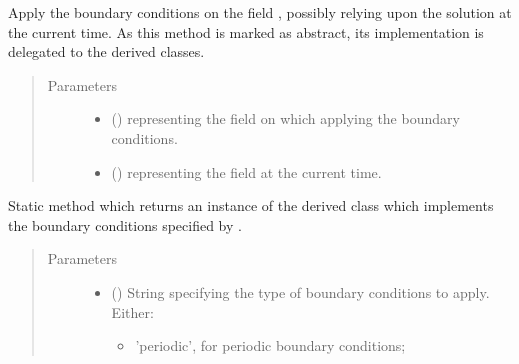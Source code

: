 \documentclass[letterpaper,10pt,english]{sphinxmanual}
\begin{document}
\begin{fulllineitems}
\begin{fulllineitems}
\label{\detokenize{api:dycore.horizontal_boundary.HorizontalBoundary.apply}}
Apply the boundary conditions on the field , possibly relying upon the solution
 at the current time.
As this method is marked as abstract, its implementation is delegated to the derived classes.
\begin{quote}\begin{description}
\item[{Parameters}] \leavevmode\begin{itemize}
\item {} 
 () \textendash{}  representing the field on which applying the boundary conditions.

\item {} 
 () \textendash{}  representing the field at the current time.

\end{itemize}

\end{description}\end{quote}

\end{fulllineitems}


\begin{fulllineitems}
\label{\detokenize{api:dycore.horizontal_boundary.HorizontalBoundary.factory}}
Static method which returns an instance of the derived class which implements the boundary
conditions specified by .
\begin{quote}\begin{description}
\item[{Parameters}] \leavevmode\begin{itemize}
\item {} 
 () \textendash{} 
String specifying the type of boundary conditions to apply. Either:
\begin{itemize}
\item {} 
’periodic’, for periodic boundary conditions;


\end{itemize}
\end{itemize}
\end{description}
\end{quote}
\end{fulllineitems}
\end{fulllineitems}
\end{document}
